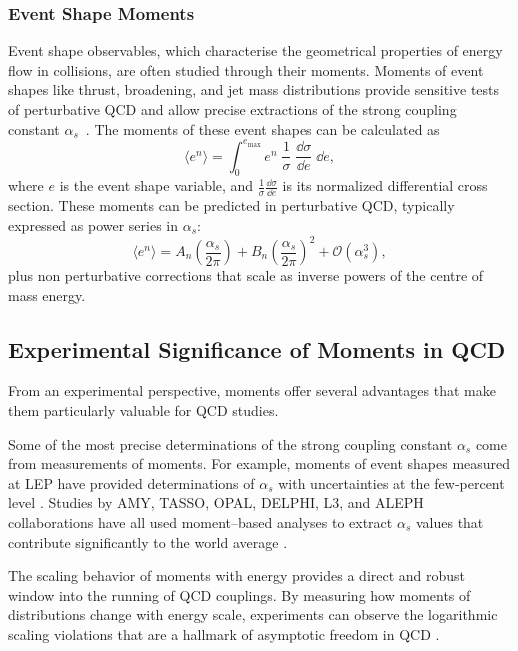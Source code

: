         \subsubsection{Event Shape Moments}
            Event shape observables, which characterise the geometrical properties of energy flow in collisions, are often studied through their moments.
            Moments of event shapes like thrust, broadening, and jet mass distributions provide sensitive tests of perturbative QCD and allow precise extractions of the strong coupling constant $\alpha_s$~\cite{gehrmann_resummation_2017, Catani:1992ua}.
            The moments of these event shapes can be calculated as
            \[
                \langle e^n \rangle = \int_0^{e_{\text{max}}} e^n \;\frac{1}{\sigma}\; \frac{\dd\sigma}{\dd e}\; \dd e,
            \]
            where $e$ is the event shape variable, and $\frac{1}{\sigma} \frac{\dd\sigma}{\dd e}$ is its normalized differential cross section.
            These moments can be predicted in perturbative QCD, typically expressed as power series in $\alpha_s$:
            \[
                \langle e^n \rangle = A_n \left(\frac{\alpha_s}{2\pi}\right) + B_n \left(\frac{\alpha_s}{2\pi}\right)^2 + \mathcal{O}(\alpha_s^3),
            \]
            plus non perturbative corrections that scale as inverse powers of the centre of mass energy.
    \subsection{Experimental Significance of Moments in QCD}
        From an experimental perspective, moments offer several advantages that make them particularly valuable for QCD studies.

        Some of the most precise determinations of the strong coupling constant $\alpha_s$ come from measurements of moments.
        For example, moments of event shapes measured at LEP have provided determinations of $\alpha_s$ with uncertainties at the few-percent level .
        Studies by AMY, TASSO, OPAL, DELPHI, L3, and ALEPH collaborations have all used moment--based analyses to extract $\alpha_s$ values that contribute significantly to the world average .

        The scaling behavior of moments with energy provides a direct and robust window into the running of QCD couplings.
        By measuring how moments of distributions change with energy scale, experiments can observe the logarithmic scaling violations that are a hallmark of asymptotic freedom in QCD .

